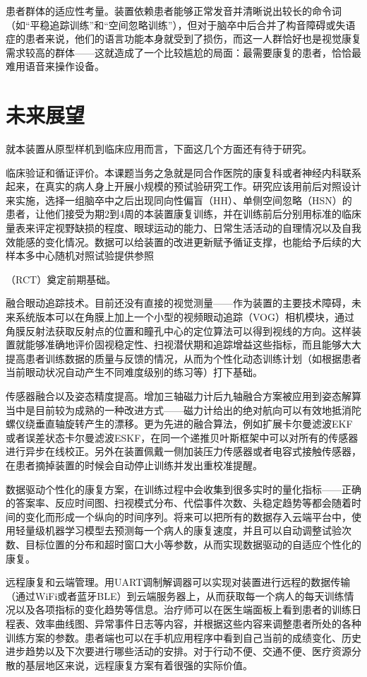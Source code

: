 患者群体的适应性考量。装置依赖患者能够正常发音并清晰说出较长的命令词（如“平稳追踪训练”和“空间忽略训练”），但对于脑卒中后合并了构音障碍或失语症的患者来说，他们的语言功能本身就受到了损伤，而这一人群恰好也是视觉康复需求较高的群体——这就造成了一个比较尴尬的局面：最需要康复的患者，恰恰最难用语音来操作设备。

\section{未来展望}

就本装置从原型样机到临床应用而言，下面这几个方面还有待于研究。

临床验证和循证评价。本课题当务之急就是同合作医院的康复科或者神经内科联系起来，在真实的病人身上开展小规模的预试验研究工作。研究应该用前后对照设计来实施，选择一组脑卒中之后出现同向性偏盲（HH）、单侧空间忽略（HSN）的患者，让他们接受为期2到4周的本装置康复训练，并在训练前后分别用标准的临床量表来评定视野缺损的程度、眼球运动的能力、日常生活活动的自理情况以及自我效能感的变化情况。数据可以给装置的改进更新赋予循证支撑，也能给予后续的大样本多中心随机对照试验提供参照

（RCT）奠定前期基础。

融合眼动追踪技术。目前还没有直接的视觉测量——作为装置的主要技术障碍，未来系统版本可以在角膜上加上一个小型的视频眼动追踪（VOG）相机模块，通过角膜反射法获取反射点的位置和瞳孔中心的定位算法可以得到视线的方向。这样装置就能够准确地评价固视稳定性、扫视潜伏期和追踪增益这些指标，而且能够大大提高患者训练数据的质量与反馈的情况，从而为个性化动态训练计划（如根据患者当前眼动状况自动产生不同难度级别的练习等）打下基础。

传感器融合以及姿态精度提高。增加三轴磁力计后九轴融合方案被应用到姿态解算当中是目前较为成熟的一种改进方式——磁力计给出的绝对航向可以有效地抵消陀螺仪绕垂直轴旋转产生的漂移。更为先进的融合算法，例如扩展卡尔曼滤波EKF或者误差状态卡尔曼滤波ESKF，在同一个递推贝叶斯框架中可以对所有的传感器进行异步在线校正。另外在装置佩戴一侧加装压力传感器或者电容式接触传感器，在患者摘掉装置的时候会自动停止训练并发出重校准提醒。

数据驱动个性化的康复方案，在训练过程中会收集到很多实时的量化指标——正确的答案率、反应时间图、扫视模式分布、代偿事件次数、头稳定趋势等都会随着时间的变化而形成一个纵向的时间序列。将来可以把所有的数据存入云端平台中，使用轻量级机器学习模型去预测每一个病人的康复速度，并且可以自动调整试验次数、目标位置的分布和超时窗口大小等参数，从而实现数据驱动的自适应个性化的康复。

远程康复和云端管理。用UART调制解调器可以实现对装置进行远程的数据传输（通过WiFi或者蓝牙BLE）到云端服务器上，从而获取每一个病人的每天训练情况以及各项指标的变化趋势等信息。治疗师可以在医生端面板上看到患者的训练日程表、效率曲线图、异常事件日志等内容，并根据这些内容来调整患者所处的各种训练方案的参数。患者端也可以在手机应用程序中看到自己当前的成绩变化、历史进步趋势以及下次要进行哪些活动的安排。对于行动不便、交通不便、医疗资源分散的基层地区来说，远程康复方案有着很强的实际价值。

